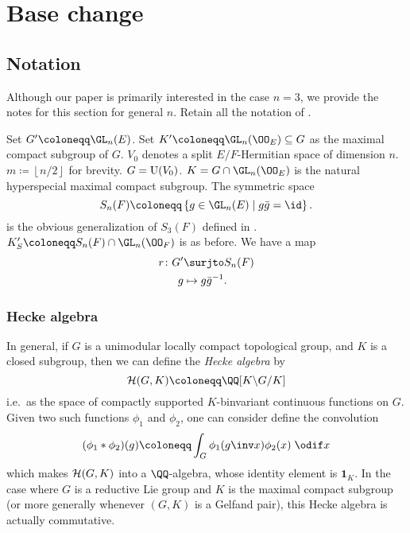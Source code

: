 \chapter{Base change}
\section{Notation}
Although our paper is primarily interested in the case $n=3$,
we provide the notes for this section for general $n$.
Retain all the notation of .

\begin{itemize}
  \ii Set $G' \coloneqq \GL_n(E)$.
  \ii Set $K' \coloneqq \GL_n(\OO_E) \subseteq G$ as the maximal compact subgroup of $G$.
  \ii $V_0$ denotes a split $E/F$-Hermitian space of dimension $n$.
  \ii $m \coloneqq \left\lfloor n/2 \right\rfloor$ for brevity.
  \ii $G = \operatorname{U}(V_0)$.
  \ii $K = G \cap \GL_n(\OO_E)$ is the natural hyperspecial maximal compact subgroup.
  \ii The symmetric space
  \[ S_n(F) \coloneqq \left\{ g \in \GL_n(E) \mid g \bar g = \id \right\}. \]
  is the obvious generalization of $S_3(F)$ defined in .
  \ii $K'_S \coloneqq S_n(F) \cap \GL_n(\OO_F)$ is as before.
  \ii We have a map
  \begin{align*}
    r \colon G' &\surjto S_n(F) \\
    g &\mapsto g\bar{g}^{-1}.
  \end{align*}
\end{itemize}

\subsection{Hecke algebra}
In general, if $G$ is a unimodular locally compact topological group,
and $K$ is a closed subgroup, then we can define the \emph{Hecke algebra} by
\[ \HH(G, K) \coloneqq \QQ[K \backslash G \slash K] \]
i.e.\ as the space of compactly supported $K$-binvariant continuous functions on $G$.
Given two such functions $\phi_1$ and $\phi_2$, one can consider define the convolution
\[ (\phi_1 \ast \phi_2)(g) \coloneqq \int_G \phi_1(g\inv x) \phi_2(x) \; \odif x \]
which makes $\mathcal H(G, K)$ into a $\QQ$-algebra,
whose identity element is $\mathbf{1}_K$.
In the case where $G$ is a reductive Lie group and
$K$ is the maximal compact subgroup
(or more generally whenever $(G,K)$ is a Gelfand pair),
this Hecke algebra is actually commutative.


